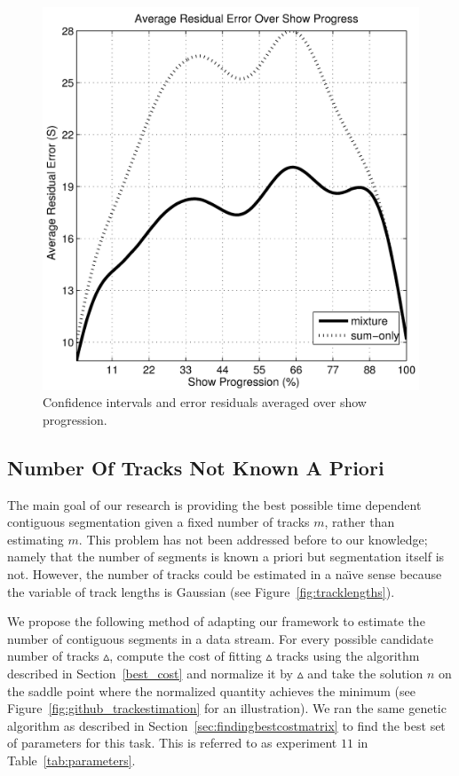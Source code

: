 \documentclass[twocolumn]{article}
\begin{document}
\begin{figure}
	\includegraphics[scale=0.4]{images//residualsagainstprogress}
	
	\caption{Confidence intervals and error residuals averaged over show progression.}
	\label{fig:confidence_intervals}
	
\end{figure}


\subsection{Number Of Tracks Not Known A Priori}\label{sec:trackcount}

The main goal of our research is providing the best possible time dependent contiguous segmentation given a fixed number of tracks $m$, rather than estimating $m$. This problem has not been addressed before to our knowledge; namely that the number of segments is known a priori but segmentation itself is not. However, the number of tracks could be estimated in a na\"{\i}ve sense because the variable of track lengths is Gaussian (see Figure~\ref{fig:tracklengths}). 


We propose the following method of adapting our framework to estimate the number of contiguous segments in a data stream. For every possible candidate number of tracks $\vartriangle$, compute the cost of fitting $\vartriangle$ tracks using the algorithm described in Section~\ref{best_cost} and normalize it by $\vartriangle$ and take the solution $n$ on the saddle point where the normalized quantity achieves the minimum (see Figure~\ref{fig:github_trackestimation} for an illustration). We ran the same genetic algorithm as described in Section~\ref{sec:findingbestcostmatrix} to find the best set of parameters for this task. This is referred to as experiment $11$ in Table~\ref{tab:parameters}.
\end{document}
